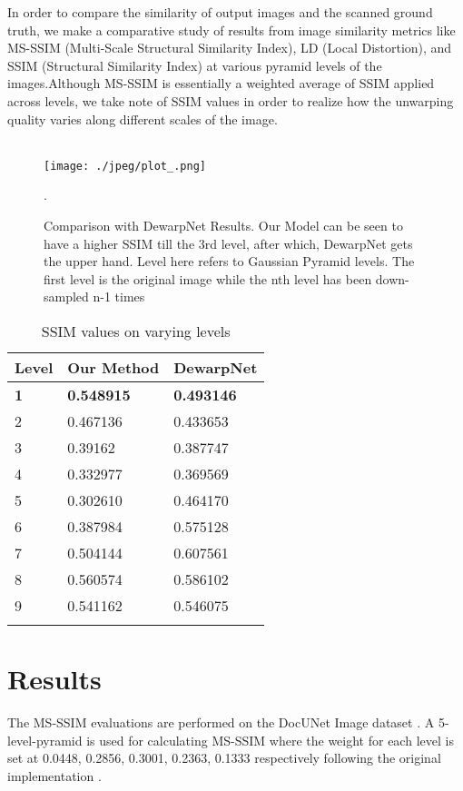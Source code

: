 \documentclass[a4paper,conference]{IEEEtran}
\begin{document}
	
	In order to compare the similarity of output images and the scanned ground truth, we make a comparative study of results from image similarity metrics like MS-SSIM (Multi-Scale Structural Similarity Index), LD (Local Distortion), and SSIM (Structural Similarity Index) at various pyramid levels of the images.Although MS-SSIM is essentially a weighted average of SSIM applied across levels, we take note of SSIM values in order to realize how the unwarping quality varies along different scales of the image.
	\\
	\\
	\begin{figure}
		\centering
		\texttt{[image: ./jpeg/plot\_.png]}
		\caption{Comparison with DewarpNet Results. Our Model can be seen to have a higher SSIM till the 3rd level, after which, DewarpNet gets the upper hand. Level here refers to Gaussian Pyramid levels. The first level is the original image while the nth level has been down-sampled n-1 times}.
	\end{figure}
	\begin{table}[h]
	\centering 
	\caption{SSIM values on varying levels}
	\begin{tabular*}{\linewidth}{p{70pt}p{50pt}p{70pt}}    \toprule
		\textbf{Level} & \textbf{Our Method}&\textbf{DewarpNet \cite{das2019dewarpnet}}\\\midrule
		 \textbf{1} & \textbf{0.548915}& \textbf{0.493146} \\
		2& 0.467136&0.433653  \\
		3&0.39162&0.387747\\
		4&0.332977&0.369569\\
		5&0.302610&0.464170\\
		6&0.387984&0.575128\\
		7&0.504144&0.607561\\
		8&0.560574&0.586102\\
		9&0.541162&0.546075\\
		\hline
	\label{table:tab1}
	\end{tabular*}
\end{table} 	\section{Results}
	
	The MS-SSIM evaluations are performed on the DocUNet Image dataset \cite{Ma-CVPR18}. A 5-level-pyramid is used for calculating MS-SSIM where the weight for each	level is set at 0.0448, 0.2856, 0.3001, 0.2363, 0.1333 respectively following the original implementation \cite{wang2003multiscale}.
	
\end{document}
